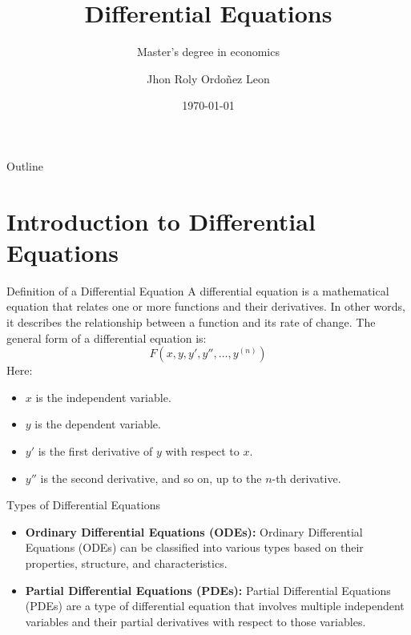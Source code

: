 \documentclass[aspectratio=169]{beamer}
\title{Differential Equations}
\subtitle{Master's degree in economics}
\author[JR]{Jhon Roly Ordoñez Leon}
\date{\today}
\institute{
        National University of Peru\\
        Faculty of Economic, Administrative and Accounting Sciences\\
        Professional School of Economics
    }
\begin{document}
	\begin{frame}
		\titlepage
	\end{frame}
	\begin{frame}{Outline}
		\tableofcontents
	\end{frame}
	\section{Introduction to Differential Equations}
		\begin{frame}{Definition of a Differential Equation}
			A differential equation is a mathematical equation
			that relates one or more functions and their derivatives.
			In other words, it describes the relationship between a function
			and its rate of change. The general form of a differential equation is:
				\begin{equation}
					F(x,y,y',y'', \dots, y^{(n)})
				\end{equation}
			Here:
				\begin{itemize}
					\item $x$ is the independent variable.
					\item $y$ is the dependent variable.
					\item $y'$ is the first derivative of $y$ with respect to $x$.
					\item $y''$ is the second derivative, and so on, up to the $n$-th derivative.
				\end{itemize}
		\end{frame}
		\begin{frame}{Types of Differential Equations}
			\begin{itemize}
				\item \textbf{Ordinary Differential Equations (ODEs):} Ordinary Differential Equations (ODEs) can be
					classified into various types based on their properties, structure, and characteristics.
				\item \textbf{Partial Differential Equations (PDEs):} Partial Differential Equations (PDEs) are a type of differential equation that involves multiple
					independent variables and their partial derivatives with respect to those variables.
			\end{itemize}
		\end{frame}
\end{document}
